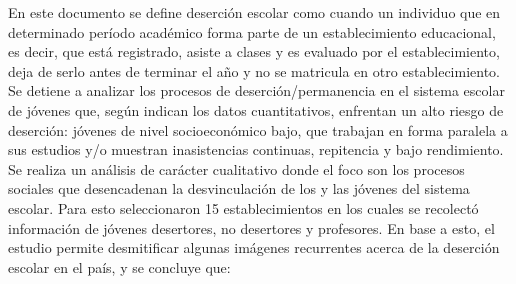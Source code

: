 En este documento se define deserción escolar como cuando un individuo que en determinado período académico forma parte de un establecimiento educacional, es decir, que está registrado, asiste a clases y es evaluado por el establecimiento, deja de serlo antes de terminar el año y no se matricula en otro establecimiento. Se detiene a analizar los procesos de deserción/permanencia en el sistema escolar de jóvenes que, según indican los datos cuantitativos, enfrentan un alto riesgo de deserción: jóvenes de nivel socioeconómico bajo, que trabajan en forma paralela a sus estudios y/o muestran inasistencias continuas, repitencia y bajo rendimiento.
Se realiza un análisis de carácter cualitativo donde el foco son los procesos sociales que desencadenan la desvinculación de los y las jóvenes del sistema escolar. Para esto seleccionaron 15 establecimientos en los cuales se recolectó información de jóvenes desertores, no desertores y profesores. En base a esto, el estudio permite desmitificar algunas imágenes recurrentes acerca de la deserción escolar en el país, y se concluye que:
